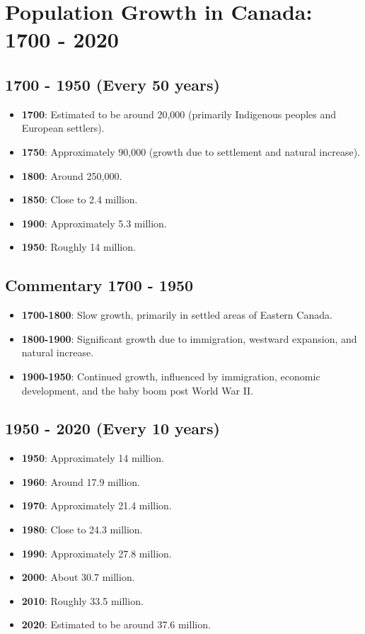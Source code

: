 \section*{Population Growth in Canada: 1700 - 2020}

\subsection*{1700 - 1950 (Every 50 years)}
\begin{itemize}
    \item \textbf{1700}: Estimated to be around 20,000 (primarily Indigenous peoples and European settlers).
    \item \textbf{1750}: Approximately 90,000 (growth due to settlement and natural increase).
    \item \textbf{1800}: Around 250,000.
    \item \textbf{1850}: Close to 2.4 million.
    \item \textbf{1900}: Approximately 5.3 million.
    \item \textbf{1950}: Roughly 14 million.
\end{itemize}

\subsection*{Commentary 1700 - 1950}
\begin{itemize}
    \item \textbf{1700-1800}: Slow growth, primarily in settled areas of Eastern Canada.
    \item \textbf{1800-1900}: Significant growth due to immigration, westward expansion, and natural increase.
    \item \textbf{1900-1950}: Continued growth, influenced by immigration, economic development, and the baby boom post World War II.
\end{itemize}

\subsection*{1950 - 2020 (Every 10 years)}
\begin{itemize}
    \item \textbf{1950}: Approximately 14 million.
    \item \textbf{1960}: Around 17.9 million.
    \item \textbf{1970}: Approximately 21.4 million.
    \item \textbf{1980}: Close to 24.3 million.
    \item \textbf{1990}: Approximately 27.8 million.
    \item \textbf{2000}: About 30.7 million.
    \item \textbf{2010}: Roughly 33.5 million.
    \item \textbf{2020}: Estimated to be around 37.6 million.
\end{itemize}

